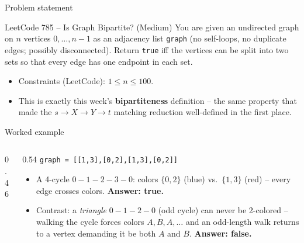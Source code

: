 \documentclass[11pt,aspectratio=169]{beamer}
\begin{document}
\begin{frame}{Problem statement}
  \begin{block}{LeetCode 785 -- Is Graph Bipartite? (\textcolor{blue!50!black}{Medium})}
    You are given an undirected graph on $n$ vertices $0,\dots,n-1$ as an adjacency
    list \texttt{graph} (no self-loops, no duplicate edges; possibly disconnected).
    Return \texttt{true} iff the vertices can be split into two sets so that every
    edge has one endpoint in each set.
  \end{block}
  \begin{itemize}
    \item Constraints (LeetCode): $1 \le n \le 100$.
    \item This is exactly this week's \textbf{bipartiteness} definition -- the same
    property that made the $s\to X\to Y\to t$ matching reduction well-defined in the
    first place.
  \end{itemize}
\end{frame}

\begin{frame}{Worked example}
  \begin{columns}
  \begin{column}{0.46\textwidth}
  \begin{center}
  \end{center}
  \end{column}
  \begin{column}{0.54\textwidth}
  \small
  \texttt{graph = [[1,3],[0,2],[1,3],[0,2]]}
  \begin{itemize}
    \item A 4-cycle $0{-}1{-}2{-}3{-}0$: colors $\{0,2\}$ (blue) vs.\ $\{1,3\}$ (red) --
    every edge crosses colors. \textbf{Answer: true.}
    \item Contrast: a \emph{triangle} $0{-}1{-}2{-}0$ (odd cycle) can never be
    2-colored -- walking the cycle forces colors
    $A,B,A,\dots$ and an odd-length walk returns to a vertex demanding it be both $A$
    and $B$. \textbf{Answer: false.}
  \end{itemize}
  \end{column}
  \end{columns}
\end{frame}
\end{document}

